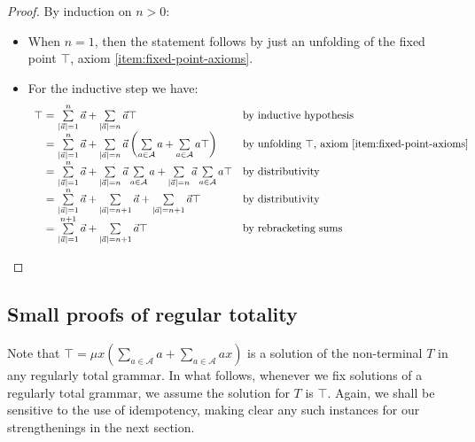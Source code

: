 \documentclass[a4paper,10pt]{amsart}
\theoremstyle{definition}
\newcommand{\Alphabet}{\mathcal{A}}
\begin{document}
\begin{proof}
    By induction on $n>0$:
    \begin{itemize}
        \item When $n=1$, then the statement follows by just an unfolding of the fixed point $\top$, axiom \eqref{item:fixed-point-axioms}.
        \item For the inductive step we have:
        \[
        \begin{array}{r@{\ = \ }ll}
             \top & \sum\limits_{|\vec a|=1}^{n}\vec a + \sum\limits_{|\vec a|= n} \vec a \top & \text{by inductive hypothesis} \\
                & \sum\limits_{|\vec a|=1}^{n}\vec a + \sum\limits_{|\vec a|= n} \vec a \left(\sum\limits_{a \in \Alphabet} a + \sum\limits_{a\in \Alphabet} a\top \right) & \text{by unfolding $\top$, axiom \eqref{item:fixed-point-axioms}} \\
                & \sum\limits_{|\vec a|=1}^{n}\vec a + \sum\limits_{|\vec a|= n} \vec a \sum\limits_{a \in \Alphabet} a + \sum\limits_{|\vec a|= n} \vec a\sum\limits_{a\in \Alphabet} a\top & \text{by distributivity} \\
                & \sum\limits_{|\vec a|=1}^{n}\vec a + \sum\limits_{|\vec a|= n+1} \vec a + \sum\limits_{|\vec a|= n+1} \vec a\top & \text{by distributivity} \\
                & \sum\limits_{|\vec a|=1}^{n+1}\vec a + \sum\limits_{|\vec a|= n+1} \vec a\top & \text{by rebracketing sums} \qedhere
        \end{array}
        \]
    \end{itemize}
\end{proof}

\subsection{Small proofs of regular totality}

Note that $\top =\mu x \left(\sum\limits_{a \in \Alphabet} a + \sum\limits_{a\in \Alphabet} ax \right)$ is a solution of the non-terminal $T$ in any regularly total grammar.
In what follows, whenever we fix solutions of a regularly total grammar, we assume the solution for $T$ is $\top$.
Again, we shall be sensitive to the use of idempotency, making clear any such instances for our strengthenings in the next section.
\end{document}

